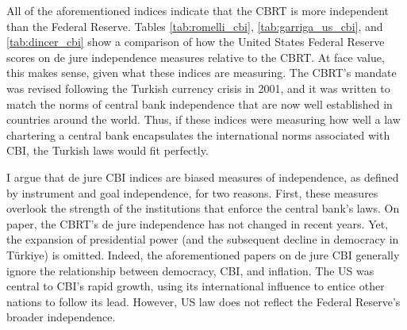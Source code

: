 \documentclass[12pt,a4paper]{article}
\begin{document}
\begin{doublespace}
All of the aforementioned indices indicate that the CBRT is more independent than the Federal Reserve. Tables \ref{tab:romelli_cbi}, \ref{tab:garriga_us_cbi}, and \ref{tab:dincer_cbi} show a comparison of how the United States Federal Reserve scores on de jure independence measures relative to the CBRT. At face value, this makes sense, given what these indices are measuring. The CBRT's mandate was revised following the Turkish currency crisis in 2001, and it was written to match the norms of central bank independence that are now well established in countries around the world. Thus, if these indices were measuring how well a law chartering a central bank encapsulates the international norms associated with CBI, the Turkish laws would fit perfectly.

I argue that de jure CBI indices are biased measures of independence, as defined by instrument and goal independence, for two reasons. First, these measures overlook the strength of the institutions that enforce the central bank's laws. On paper, the CBRT's de jure independence has not changed in recent years. Yet, the expansion of presidential power (and the subsequent decline in democracy in T\"urkiye) is omitted. Indeed, the aforementioned papers on de jure CBI generally ignore the relationship between democracy, CBI, and inflation. The US was central to CBI's rapid growth, using its international influence to entice other nations to follow its lead. However, US law does not reflect the Federal Reserve's broader independence. 





\end{doublespace}
\end{document}
